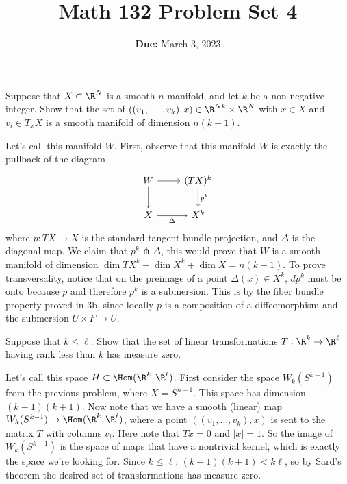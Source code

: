 \documentclass[11pt,letterpaper]{article}
\title{\textbf{Math 132 Problem Set 4}}
\date{\textbf{Due:} March 3, 2023}
\begin{document}
\maketitle

\begin{problem}
    Suppose that $X\subset \R^N$ is a smooth $n$-manifold, and let $k$ be a non-negative integer. Show that the set of $((v_1,\ldots,v_k),x)\in \R^{Nk}\times \R^N$ with $x\in X$ and $v_i\in T_xX$ is a smooth manifold of dimension $n(k+1)$.
\end{problem}

\begin{solution}
    \quad Let's call this manifold $W$. First, observe that this manifold $W$ is exactly the pullback of the diagram
    \[\begin{tikzcd}[ampersand replacement=\&]
        W \& {(TX)^k} \\
        X \& {X^k}
        \arrow["{p^k}", from=1-2, to=2-2]
        \arrow["\Delta"', from=2-1, to=2-2]
        \arrow[from=1-1, to=2-1]
        \arrow[from=1-1, to=1-2]
    \end{tikzcd}\]
    where $p: TX \to X$ is the standard tangent bundle projection, and $\Delta$ is the diagonal map. We claim that $p^k\pitchfork \Delta$, this would prove that $W$ is a smooth manifold of dimension $\dim TX^k - \dim X^k + \dim X = n(k+1)$. To prove transversality, notice that on the preimage of a point $\Delta(x)\in X^k$, $dp^k$ must be onto because $p$ and therefore $p^k$ is a submersion. This is by the fiber bundle property proved in 3b, since locally $p$ is a composition of a diffeomorphism and the submersion $U\times F \to U$.
\end{solution}

\begin{problem}
    Suppose that $k\leq \ell$. Show that the set of linear transformations $T : \R^k\to \R^\ell$ having rank less than $k$ has measure zero.
\end{problem}

\begin{solution}
    \quad Let's call this space $H\subset \Hom(\R^k, \R^\ell)$. First consider the space $W_k(S^{k-1})$ from the previous problem, where $X=S^{n-1}$. This space has dimension $(k-1)(k+1)$. Now note that we have a smooth (linear) map $W_k(S^{k-1}) \to \Hom(\R^k, \R^\ell)$, where a point $((v_1,\ldots,v_k), x)$ is sent to the matrix $T$ with columns $v_i$. Here note that $Tx=0$ and $|x|=1$. So the image of $W_k(S^{k-1})$ is the space of maps that have a nontrivial kernel, which is exactly the space we're looking for. Since $k\leq \ell$, $(k-1)(k+1)<k\ell$, so by Sard's theorem the desired set of transformations has measure zero. 
\end{solution}
\end{document}
